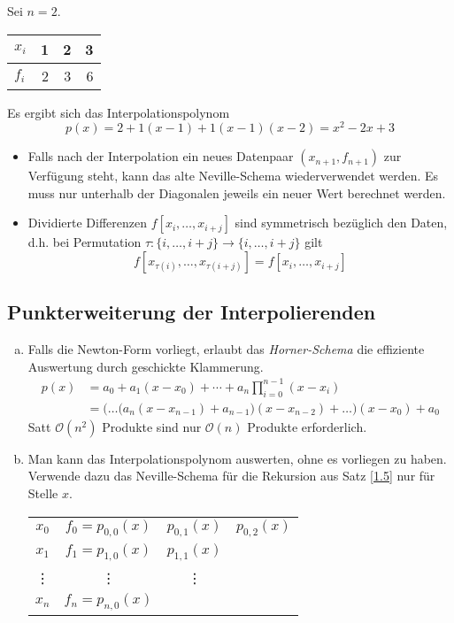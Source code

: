 \documentclass[11pt]{scrbook}
\begin{document}
\begin{ex*}
	Sei $n=2$.	
	\begin{tabular}{l|rrr}
		$x_i$ & 1 & 2 & 3  \\ \hline
		$f_i$ & 2 & 3 & 6 
	\end{tabular}
	
	Es ergibt sich das Interpolationspolynom
	\[
		p(x) = 2+ 1(x-1) + 1(x-1)(x-2) = x^2 -2x+3
	\]
\end{ex*}

\begin{note}
	\begin{itemize}
		\item Falls nach der Interpolation ein neues Datenpaar $(x_{n+1},f_{n+1})$ zur Verfügung steht, kann das alte Neville-Schema wiederverwendet werden.
			Es muss nur unterhalb der Diagonalen jeweils ein neuer Wert berechnet werden.
		\item
			Dividierte Differenzen $f[x_i,\dotsc,x_{i+j}]$ sind symmetrisch bezüglich den Daten, d.h. bei Permutation $\tau: \{i,\dotsc,i+j\} \to \{i,\dotsc,i+j\}$ gilt
			\[
				f[x_{\tau(i)},\dotsc,x_{\tau(i+j)}] = f[x_i,\dotsc,x_{i+j}]
			\]
	\end{itemize}
\end{note}

\subsection{Punkterweiterung der Interpolierenden}

\begin{enumerate}[a)]
	\item 
		Falls die Newton-Form vorliegt, erlaubt das \emph{Horner-Schema} die effiziente Auswertung durch geschickte Klammerung.
		\begin{align*}
			p(x) &= a_0 + a_1(x-x_0) + \dotsb + a_n\prod_{i=0}^{n-1}(x-x_i)\\
				&= \bigg(\dotso \Big(a_n(x-x_{n-1}) + a_{n-1}\Big)(x-x_{n-2}) + \dotso \bigg)(x-x_0) +  a_0
		\end{align*}
		Satt $\mathcal O(n^2)$ Produkte sind nur  $\mathcal O(n)$ Produkte erforderlich.
	\item
		Man kann das Interpolationspolynom auswerten, ohne es vorliegen zu haben.
		Verwende dazu das Neville-Schema für die Rekursion aus Satz \ref{1.5} nur für Stelle $x$.
		\begin{table}[!ht]
			\centering
			\begin{tabular}{cccc}
				$x_0$ & $f_0=p_{0,0}(x)$ & $p_{0,1}(x)$ & $p_{0,2}(x)$ \\
				$x_1$ & $f_1=p_{1,0}(x)$ & $p_{1,1}(x)$ &  \\
				\vdots & \vdots & \vdots\\
				$x_n$ & $f_n=p_{n,0}(x)$ &\\
			\end{tabular}
		\end{table}
\end{enumerate}
\end{document}

